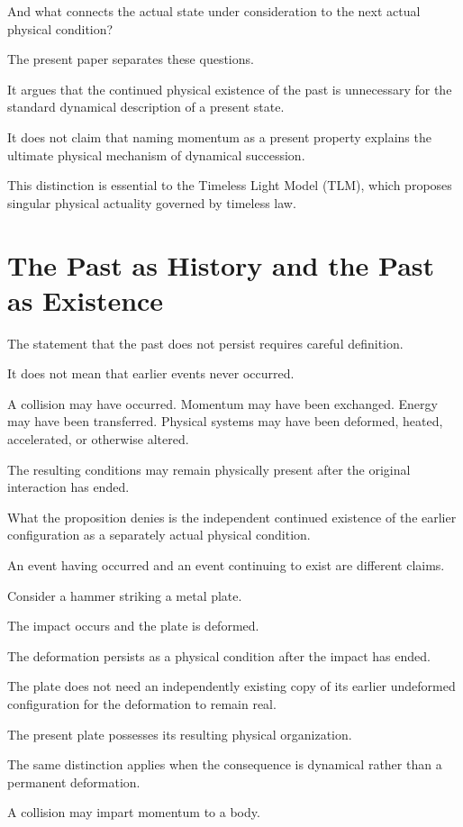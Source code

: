 \documentclass[12pt,onecolumn]{article}
\begin{document}
And what connects the actual state under consideration to the next actual physical condition?

The present paper separates these questions.

It argues that the continued physical existence of the past is unnecessary for the standard dynamical description of a present state.

It does not claim that naming momentum as a present property explains the ultimate physical mechanism of dynamical succession.

This distinction is essential to the Timeless Light Model (TLM), which proposes singular physical actuality governed by timeless law.


\section{The Past as History and the Past as Existence}

The statement that the past does not persist requires careful definition.

It does not mean that earlier events never occurred.

A collision may have occurred. Momentum may have been exchanged. Energy may have been transferred. Physical systems may have been deformed, heated, accelerated, or otherwise altered.

The resulting conditions may remain physically present after the original interaction has ended.

What the proposition denies is the independent continued existence of the earlier configuration as a separately actual physical condition.

An event having occurred and an event continuing to exist are different claims.

Consider a hammer striking a metal plate.

The impact occurs and the plate is deformed.

The deformation persists as a physical condition after the impact has ended.

The plate does not need an independently existing copy of its earlier undeformed configuration for the deformation to remain real.

The present plate possesses its resulting physical organization.

The same distinction applies when the consequence is dynamical rather than a permanent deformation.

A collision may impart momentum to a body.
\end{document}
